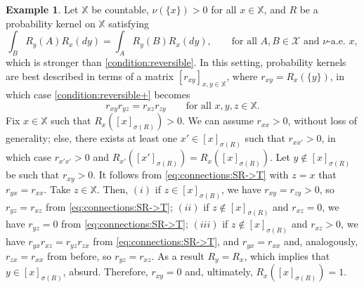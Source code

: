 \documentclass[a4paper]{article}
\theoremstyle{plain}
\theoremstyle{remark}
\theoremstyle{definition}
\newtheorem{example}[theorem]{Example}
\begin{document}
\begin{example}\label{example:connections:countable}
Let $\mathbb{X}$ be countable, $\nu(\{x\})>0$ for all $x\in\mathbb{X}$, and $R$ be a probability kernel on $\mathbb{X}$ satisfying 
\begin{equation}\label{condition:reversible+}\tag{C+}
\int_BR_y(A)R_x(dy)=\int_AR_y(B)R_x(dy),\qquad\mbox{for all }A,B\in\mathcal{X}\mbox{ and }\nu\mbox{-a.e. }x,
\end{equation}
which is stronger than \eqref{condition:reversible}. In this setting, probability kernels are best described in terms of a matrix $[r_{xy}]_{x,y\in\mathbb{X}}$, where $r_{xy}=R_x(\{y\})$, in which case \eqref{condition:reversible+} becomes
\begin{equation}\label{eq:connections:SR->T}
r_{xy}r_{yz}=r_{xz}r_{zy}\qquad\mbox{for all }x,y,z\in\mathbb{X}.
\end{equation}
Fix $x\in\mathbb{X}$ such that $R_x([x]_{\sigma(R)})>0$. We can assume $r_{xx}>0$, without loss of generality; else, there exists at least one $x'\in[x]_{\sigma(R)}$ such that $r_{xx'}>0$, in which case $r_{x'x'}>0$ and $R_{x'}([x']_{\sigma(R)})=R_x([x]_{\sigma(R)})$. Let $y\notin[x]_{\sigma(R)}$ be such that $r_{xy}>0$. It follows from \eqref{eq:connections:SR->T} with $z=x$ that $r_{yx}=r_{xx}$. Take $z\in\mathbb{X}$. Then, $(i)$ if $z\in[x]_{\sigma(R)}$, we have $r_{xy}=r_{zy}>0$, so $r_{yz}=r_{xz}$ from \eqref{eq:connections:SR->T}; $(ii)$ if $z\notin[x]_{\sigma(R)}$ and $r_{xz}=0$, we have $r_{yz}=0$ from \eqref{eq:connections:SR->T}; $(iii)$ if $z\notin[x]_{\sigma(R)}$ and $r_{xz}>0$, we have $r_{yx}r_{xz}=r_{yz}r_{zx}$ from \eqref{eq:connections:SR->T}, and $r_{yx}=r_{xx}$ and, analogously, $r_{zx}=r_{xx}$ from before, so $r_{yz}=r_{xz}$. As a result $R_y=R_x$, which implies that $y\in[x]_{\sigma(R)}$, absurd. Therefore, $r_{xy}=0$ and, ultimately, $R_x([x]_{\sigma(R)})=1$.


\end{example}
\end{document}
